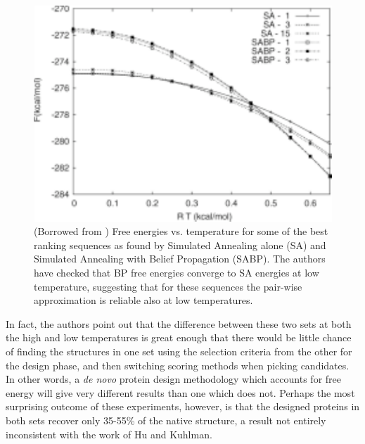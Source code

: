 \begin{figure}[h]
	\center
	\includegraphics{BP_vs_SA}
	\caption{(Borrowed from \cite{Sciretti:2008p361}) Free energies vs. temperature for some of the best ranking sequences as found by Simulated Annealing alone (SA) and Simulated Annealing with Belief Propagation (SABP). The authors have checked that BP free energies converge to SA energies at low temperature, suggesting that for these sequences the pair-wise approximation is reliable also at low temperatures.}
	\label{fig:BP_vs_SA}
\end{figure}

In fact, the authors point out that the difference between these two sets at both the high and low temperatures is great enough that there would be little chance of finding the structures in one set using the selection criteria from the other for the design phase, and then switching scoring methods when picking candidates. In other words, a \emph{de novo} protein design methodology which accounts for free energy will give very different results than one which does not. Perhaps the most surprising outcome of these experiments, however, is that the designed proteins in both sets recover only 35-55\% of the native structure, a result not entirely inconsistent with the work of Hu and Kuhlman.